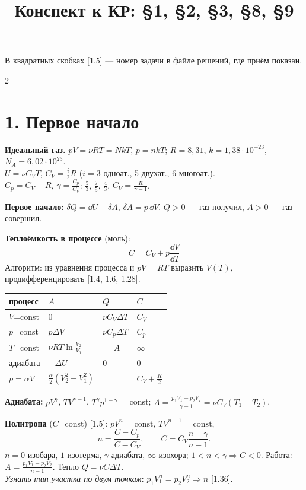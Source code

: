 \documentclass[10pt]{article}
\title{Конспект к КР: §1, §2, §3, §8, §9}
\date{}
\newcommand{\see}[1]{\textcolor{excol}{[#1]}}
\begin{document}
\maketitle
\vspace{-12mm}
{\small В квадратных скобках \see{1.5} — номер задачи в файле решений, где приём показан.}

\begin{multicols}{2}
\section*{1. Первое начало}

\textbf{Идеальный газ.}
$pV=\nu RT=NkT$, $p=nkT$; $R=8{,}31$, $k=1{,}38\cdot10^{-23}$, $N_A=6{,}02\cdot10^{23}$.
\\$U=\nu C_VT$, $C_V=\frac i2R$ ($i=3$ одноат., 5 двухат., 6 многоат.).
\\$C_p=C_V+R$, $\gamma=\frac{C_p}{C_V}$: $\frac53$, $\frac75$, $\frac43$. \;$C_V=\frac{R}{\gamma-1}$.

\textbf{Первое начало:} $\delta Q=\dd U+\delta A$, $\delta A=p\,\dd V$. \;
$Q>0$ — газ получил, $A>0$ — газ совершил.

\textbf{Теплоёмкость в процессе} (моль):
\[\boxed{C=C_V+p\frac{\dd V}{\dd T}}\]
Алгоритм: из уравнения процесса и $pV=RT$ выразить $V(T)$, продифференцировать \see{1.4, 1.6, 1.28}.

\begin{tabular}{@{}l@{\;}l@{\;}l@{\;}l@{}}
процесс & $A$ & $Q$ & $C$\\\hline
$V$=const & $0$ & $\nu C_V\Delta T$ & $C_V$\\
$p$=const & $p\Delta V$ & $\nu C_p\Delta T$ & $C_p$\\
$T$=const & $\nu RT\ln\frac{V_2}{V_1}$ & $=A$ & $\infty$\\
адиабата & $-\Delta U$ & $0$ & $0$\\
$p=\alpha V$ & $\frac{\alpha}2(V_2^2-V_1^2)$ & & $C_V+\frac R2$
\end{tabular}

\textbf{Адиабата:} $pV^\gamma$, $TV^{\gamma-1}$, $T^\gamma p^{1-\gamma}$ = const;
$A=\frac{p_1V_1-p_2V_2}{\gamma-1}=\nu C_V(T_1-T_2)$.

\textbf{Политропа} ($C$=const) \see{1.5}:
$pV^n=\text{const}$, $TV^{n-1}=\text{const}$,
\[n=\frac{C-C_p}{C-C_V},\qquad C=C_V\frac{n-\gamma}{n-1}.\]
$n=0$ изобара, $1$ изотерма, $\gamma$ адиабата, $\infty$ изохора; $1<n<\gamma\Rightarrow C<0$.
Работа: $A=\frac{p_1V_1-p_2V_2}{n-1}$. Тепло $Q=\nu C\Delta T$.
\\\emph{Узнать тип участка по двум точкам}: $p_1V_1^n=p_2V_2^n\Rightarrow n$ \see{1.36}.


\end{multicols}
\end{document}
